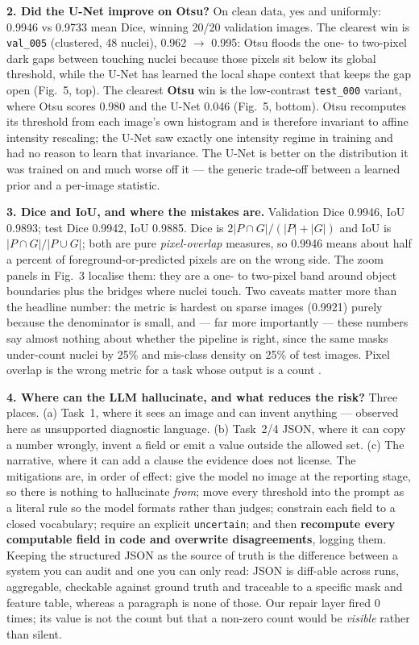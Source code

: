 \documentclass[a4paper,9pt,twocolumn]{extarticle}
\begin{document}
\textbf{2. Did the U-Net improve on Otsu?} On clean data, yes and
uniformly: 0.9946 vs 0.9733 mean Dice, winning 20/20 validation images. The
clearest win is \texttt{val\_005} (clustered, 48 nuclei), 0.962 $\rightarrow$
0.995: Otsu floods the one- to two-pixel dark gaps between touching nuclei
because those pixels sit below its global threshold, while the U-Net has learned
the local shape context that keeps the gap open (Fig.~5, top). The clearest
\textbf{Otsu} win is the low-contrast \texttt{test\_000} variant, where Otsu
scores 0.980 and the U-Net 0.046 (Fig.~5, bottom). Otsu recomputes its threshold
from each image's own histogram and is therefore invariant to affine intensity
rescaling; the U-Net saw exactly one intensity regime in training and had no
reason to learn that invariance. The U-Net is better on the distribution it was trained on and much worse off
it --- the generic trade-off between a learned prior and a per-image statistic.

\textbf{3. Dice and IoU, and where the mistakes are.} Validation Dice 0.9946,
IoU 0.9893; test Dice 0.9942, IoU 0.9885. Dice is
$2|P\cap G|/(|P|+|G|)$ and IoU is $|P\cap G|/|P\cup G|$; both are pure
\textit{pixel-overlap} measures, so 0.9946 means about half a percent of
foreground-or-predicted pixels are on the wrong side. The zoom panels in Fig.~3
localise them: they are a one- to two-pixel band around object boundaries plus
the bridges where nuclei touch. Two caveats matter more than the
headline number: the metric is hardest on sparse images (0.9921) purely because
the denominator is small, and --- far more importantly --- these numbers say
almost nothing about whether the pipeline is right, since the same masks
under-count nuclei by 25\% and mis-class density on 25\% of test images. Pixel
overlap is the wrong metric for a task whose output is a count
\cite{maierhein2024,caicedo2019}.

\textbf{4. Where can the LLM hallucinate, and what reduces the risk?} Three
places. (a) Task~1, where it sees an image and can invent anything --- observed
here as unsupported diagnostic language. (b) Task~2/4 JSON, where it can copy a
number wrongly, invent a field or emit a value outside the allowed set. (c) The
narrative, where it can add a clause the evidence does not license. The
mitigations are, in order of effect: give the model no image at the reporting
stage, so there is nothing to hallucinate \textit{from}; move every threshold
into the prompt as a literal rule so the model formats rather than judges;
constrain each field to a closed vocabulary; require an explicit
\texttt{uncertain}; and then \textbf{recompute every computable field in code
and overwrite disagreements}, logging them. Keeping the structured JSON as the source of truth is the
difference between a system you can audit and one you can only read: JSON is
diff-able across runs, aggregable, checkable against ground truth and traceable
to a specific mask and feature table, whereas a paragraph is none of those. Our
repair layer fired 0 times; its value is not the count but that a non-zero count
would be \textit{visible} rather than silent.
\end{document}
